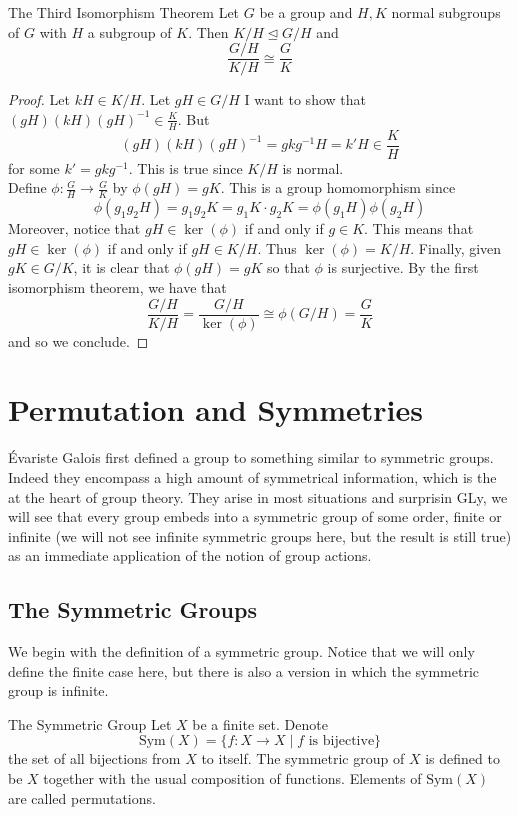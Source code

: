 \documentclass[a4paper]{article}
\begin{document}
\begin{thm}{The Third Isomorphism Theorem}{} Let $G$ be a group and $H,K$ normal subgroups of $G$ with $H$ a subgroup of $K$. Then $K/H\trianglelefteq G/H$ and $$\frac{G/H}{K/H}\cong\frac{G}{K}$$ 
\begin{proof}
Let $kH\in K/H$. Let $gH\in G/H$ I want to show that $(gH)(kH)(gH)^{-1}\in\frac{K}{H}$. But $$(gH)(kH)(gH)^{-1}=gkg^{-1}H=k'H\in\frac{K}{H}$$ for some $k'=gkg^{-1}$. This is true since $K/H$ is normal. \\

Define $\phi:\frac{G}{H}\to\frac{G}{K}$ by $\phi(gH)=gK$. This is a group homomorphism since $$\phi(g_1g_2H)=g_1g_2K=g_1K\cdot g_2K=\phi(g_1H)\phi(g_2H)$$ Moreover, notice that $gH\in\ker(\phi)$ if and only if $g\in K$. This means that $gH\in\ker(\phi)$ if and only if $gH\in K/H$. Thus $\ker(\phi)=K/H$. Finally, given $gK\in G/K$, it is clear that $\phi(gH)=gK$ so that $\phi$ is surjective. By the first isomorphism theorem, we have that $$\frac{G/H}{K/H}=\frac{G/H}{\ker(\phi)}\cong\phi(G/H)=\frac{G}{K}$$ and so we conclude. 
\end{proof}
\end{thm}

\pagebreak
\section{Permutation and Symmetries}
Évariste Galois first defined a group to something similar to symmetric groups. Indeed they encompass a high amount of symmetrical information, which is the at the heart of group theory. They arise in most situations and surprisin GLy, we will see that every group embeds into a symmetric group of some order, finite or infinite (we will not see infinite symmetric groups here, but the result is still true) as an immediate application of the notion of group actions. 

\subsection{The Symmetric Groups}
We begin with the definition of a symmetric group. Notice that we will only define the finite case here, but there is also a version in which the symmetric group is infinite. 

\begin{defn}{The Symmetric Group}{} Let $X$ be a finite set. Denote $$\text{Sym}(X)=\{f:X\to X\;|\; f\text{ is bijective}\}$$ the set of all bijections from $X$ to itself. The symmetric group of $X$ is defined to be $X$ together with the usual composition of functions. Elements of $\text{Sym}(X)$ are called permutations. 
\end{defn}
\end{document}
